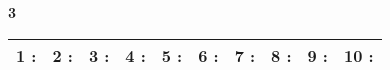 \documentclass[a4paper, 11pt]{article}
\begin{document}
{\Large\bf 3 } \hspace{1.5cm}
\begin{tabular}{| l|l|l|l|l|l|l|l|l|l| }
\hline
{\large 1 }: \hspace*{0.5cm}
& {\large 2 }: \hspace*{0.5cm}
& {\large 3 }: \hspace*{0.5cm}
& {\large 4 }: \hspace*{0.5cm}
& {\large 5 }: \hspace*{0.5cm}
& {\large 6 }: \hspace*{0.5cm}
& {\large 7 }: \hspace*{0.5cm}
& {\large 8 }: \hspace*{0.5cm}
& {\large 9 }: \hspace*{0.5cm}
& {\large 10 }: \hspace*{0.5cm}
\\ 
 \hline
\end{tabular}
\vspace*{1cm} 
\end{document}
